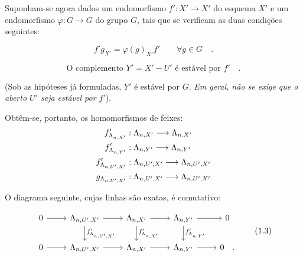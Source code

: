 Suponham-se agora dados um endomorfismo $f' : X' \to X'$ do esquema $X'$ e um endomorfismo $\varphi : G \to G$ do grupo $G$, tais que se verificam as duas condições seguintes:

\begin{equation}\tag{1.1}
f' g_{X'} = \varphi(g)_{X'} f' \qquad \forall g \in G \quad .
\end{equation}

\begin{equation}\tag{1.2}
\text{O complemento } Y' = X' - U' \text{ é estável por } f' \quad .
\end{equation}

(Sob as hipóteses já formuladas, $Y'$ é estável por $G$. \emph{Em geral, não se exige que o aberto $U'$ seja estável por $f'$}).

Obtêm-se, portanto, os homomorfismos de feixes:
\begin{align*}
f'_{\Lambda_{n,X'}} &: \Lambda_{n,X'} \longrightarrow \Lambda_{n,X'} \\
f'_{\Lambda_{n,Y'}} &: \Lambda_{n,Y'} \longrightarrow \Lambda_{n,Y'} \\
f'_{\Lambda_{n,U',X'}} &: \Lambda_{n,U',X'} \longrightarrow \Lambda_{n,U',X'} \\
g_{\Lambda_{n,U',X'}} &: \Lambda_{n,U',X'} \longrightarrow \Lambda_{n,U',X'}
\end{align*}

O diagrama seguinte, cujas linhas são exatas, é comutativo:

\[
\begin{tikzcd}
0 \arrow[r] & \La_{n,U',X'} \arrow[r] \arrow[d, "f'_{\La_{n,U',X'}}"] & \La_{n,X'} \arrow[r] \arrow[d, "f'_{\La_{n,X'}}"] & \La_{n,Y'} \arrow[r] \arrow[d, "f'_{\La_{n,Y'}}"] & 0 \\
0 \arrow[r] & \La_{n,U',X'} \arrow[r] & \La_{n,X'} \arrow[r] & \La_{n,Y'} \arrow[r] & 0 \quad .
\end{tikzcd}
\tag{1.3}
\]
